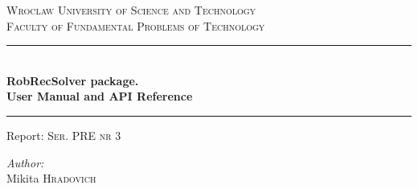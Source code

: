 \begin{titlepage}

\newcommand{\HRule}{\rule{\linewidth}{0.5mm}} %

\center %


\textsc{\Large Wroclaw University of Science and Technology}\\
\textsc{\large Faculty of Fundamental Problems of Technology}\\[2.5cm] %



\HRule \\[0.4cm]
{ \huge \bfseries{RobRecSolver package.\\ User Manual and API Reference}}\\[0.4cm] %
\HRule


Report: \textsc{Ser. PRE nr 3} \\[1.6cm]


\begin{minipage}{1.0\textwidth}
\begin{flushright} \large
\emph{Author:} \\
Mikita \textsc{Hradovich}
\end{flushright}
\end{minipage}\\[2.5cm]


\end{titlepage}
